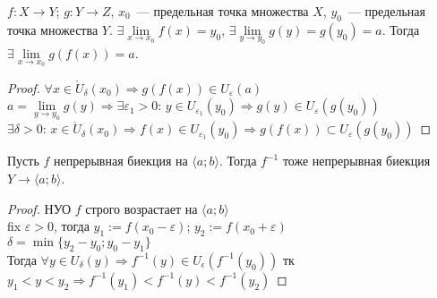 \documentclass[12pt]{article}
\begin{document}
	\begin{theorem}
		$f: X \rightarrow Y$; $g: Y \rightarrow Z$, $x_0$~--- предельная точка множества $X$, $y_0$~--- предельная точка множества $Y$. $\exists \lim \limits_{x \rightarrow x_0} f(x) = y_0$, $\exists \lim \limits_{y \rightarrow y_0} g(y) = g(y_0) = a$. Тогда $\exists \lim \limits_{x \rightarrow x_0} g(f(x)) = a$.
	\end{theorem}
	\begin{proof}
		$\forall x \in \mathring{U}_{\delta}(x_0) \Rightarrow g(f(x)) \in U_{\varepsilon} (a)$ \\
		$a = \lim \limits_{y \rightarrow y_0} g(y) \Rightarrow \exists \varepsilon_1 > 0$: $y \in U_{\varepsilon_1} (y_0) \Rightarrow g(y) \in U_{\varepsilon} (g(y_0))$ \\
		$\exists \delta > 0$: $x \in \mathring{U}_{\delta} (x_0) \Rightarrow f(x) \in U_{\varepsilon_1} (y_0) \Rightarrow g(f(x)) \subset U_{\varepsilon} (g(y_0))$
	\end{proof}
	\begin{theorem}
		Пусть $f$ непрерывная биекция на $\langle a; b \rangle$. Тогда $f^{-1}$ тоже непрерывная биекция $Y \rightarrow \langle a; b \rangle$.
	\end{theorem}
	\begin{proof}
		НУО $f$ строго возрастает на $\langle a; b \rangle$ \\
		fix $\varepsilon > 0$, тогда $y_1 := f(x_0 - \varepsilon)$; $y_2 := f(x_0 + \varepsilon)$ \\
		$\delta = \min \{ y_2 - y_0; y_0 - y_1 \}$ \\
		Тогда $\forall y \in U_{\delta} (y) \Rightarrow f^{-1} (y) \in U_{\epsilon} (f^{-1} (y_0))$ тк $y_1 < y < y_2 \Rightarrow f^{-1} (y_1) < f^{-1} (y) < f^{-1} (y_2)$
	\end{proof}
\end{document}

